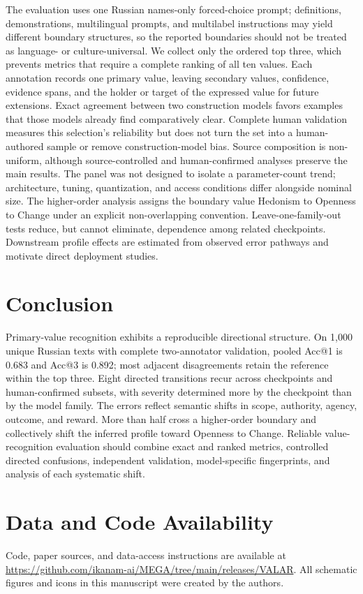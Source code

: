 \documentclass[runningheads,a4paper]{llncs}
\begin{document}
The evaluation uses one Russian names-only forced-choice prompt; definitions,
demonstrations, multilingual prompts, and multilabel instructions may yield
different boundary structures, so the reported boundaries should not be
treated as language- or culture-universal. We collect only the ordered top
three, which prevents metrics that require a complete ranking of all ten
values. Each annotation records one primary value, leaving secondary values,
confidence, evidence spans, and the holder or target of the expressed value
for future extensions. Exact agreement between two construction models favors
examples that those models already find comparatively clear. Complete human
validation measures this selection's reliability but does not turn the set
into a human-authored sample or remove construction-model bias. Source
composition is non-uniform, although source-controlled and human-confirmed
analyses preserve the main results. The panel was not designed to isolate a
parameter-count trend; architecture, tuning, quantization, and access
conditions differ alongside nominal size. The higher-order analysis assigns
the boundary value Hedonism to Openness to Change under an explicit
non-overlapping convention. Leave-one-family-out tests reduce, but cannot
eliminate, dependence among related checkpoints. Downstream profile effects
are estimated from observed error pathways and motivate direct deployment
studies.

\section{Conclusion}

Primary-value recognition exhibits a reproducible directional structure. On 1,000 unique Russian texts with complete two-annotator validation, pooled Acc@1 is 0.683 and Acc@3 is 0.892; most adjacent disagreements retain the reference within the top three. Eight directed transitions recur across checkpoints and human-confirmed subsets, with severity determined more by the checkpoint than by the model family. The errors reflect semantic shifts in scope, authority, agency, outcome, and reward. More than half cross a higher-order boundary and collectively shift the inferred profile toward Openness to Change. Reliable value-recognition evaluation should combine exact and ranked metrics, controlled directed confusions, independent validation, model-specific fingerprints, and analysis of each systematic shift.

\section*{Data and Code Availability}
Code, paper sources, and data-access instructions are available at
\url{https://github.com/ikanam-ai/MEGA/tree/main/releases/VALAR}.
All schematic figures and icons
in this manuscript were created by the authors.
\end{document}

